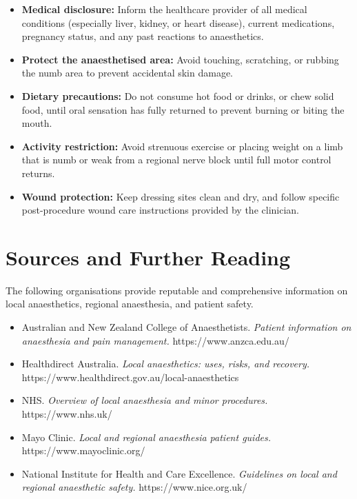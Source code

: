 \begin{itemize}
    \item \textbf{Medical disclosure:} Inform the healthcare provider of all medical conditions (especially liver, kidney, or heart disease), current medications, pregnancy status, and any past reactions to anaesthetics.
    \item \textbf{Protect the anaesthetised area:} Avoid touching, scratching, or rubbing the numb area to prevent accidental skin damage.
    \item \textbf{Dietary precautions:} Do not consume hot food or drinks, or chew solid food, until oral sensation has fully returned to prevent burning or biting the mouth.
    \item \textbf{Activity restriction:} Avoid strenuous exercise or placing weight on a limb that is numb or weak from a regional nerve block until full motor control returns.
    \item \textbf{Wound protection:} Keep dressing sites clean and dry, and follow specific post-procedure wound care instructions provided by the clinician.
\end{itemize}

\section*{Sources and Further Reading}
The following organisations provide reputable and comprehensive information on local anaesthetics, regional anaesthesia, and patient safety.

\begin{itemize}
    \item Australian and New Zealand College of Anaesthetists. \textit{Patient information on anaesthesia and pain management.} https://www.anzca.edu.au/
    \item Healthdirect Australia. \textit{Local anaesthetics: uses, risks, and recovery.} https://www.healthdirect.gov.au/local-anaesthetics
    \item NHS. \textit{Overview of local anaesthesia and minor procedures.} https://www.nhs.uk/
    \item Mayo Clinic. \textit{Local and regional anaesthesia patient guides.} https://www.mayoclinic.org/
    \item National Institute for Health and Care Excellence. \textit{Guidelines on local and regional anaesthetic safety.} https://www.nice.org.uk/
\end{itemize}
